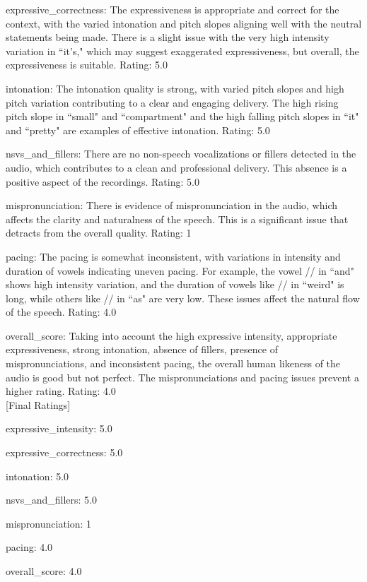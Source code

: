 \begin{tcolorbox}[blue_box, title = {{Audio Sample 3 : Ground-truth Human-likeness Rating = 4.0}}]
expressive\_correctness: The expressiveness is appropriate and correct for the context, with the varied intonation and pitch slopes aligning well with the neutral statements being made. There is a slight issue with the very high intensity variation in ``it's," which may suggest exaggerated expressiveness, but overall, the expressiveness is suitable. Rating: 5.0


intonation: The intonation quality is strong, with varied pitch slopes and high pitch variation contributing to a clear and engaging delivery. The high rising pitch slope in ``small" and ``compartment" and the high falling pitch slopes in ``it" and ``pretty" are examples of effective intonation. Rating: 5.0


nsvs\_and\_fillers: There are no non-speech vocalizations or fillers detected in the audio, which contributes to a clean and professional delivery. This absence is a positive aspect of the recordings. Rating: 5.0


mispronunciation: There is evidence of mispronunciation in the audio, which affects the clarity and naturalness of the speech. This is a significant issue that detracts from the overall quality. Rating: 1


pacing: The pacing is somewhat inconsistent, with variations in intensity and duration of vowels indicating uneven pacing. For example, the vowel // in ``and" shows high intensity variation, and the duration of vowels like // in ``weird" is long, while others like // in ``as" are very low. These issues affect the natural flow of the speech. Rating: 4.0


overall\_score: Taking into account the high expressive intensity, appropriate expressiveness, strong intonation, absence of fillers, presence of mispronunciations, and inconsistent pacing, the overall human likeness of the audio is good but not perfect. The mispronunciations and pacing issues prevent a higher rating. Rating: 4.0 \\


[Final Ratings]

expressive\_intensity: 5.0

expressive\_correctness: 5.0

intonation: 5.0

nsvs\_and\_fillers: 5.0

mispronunciation: 1

pacing: 4.0

overall\_score: 4.0
\end{tcolorbox}